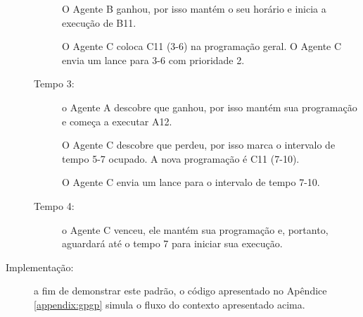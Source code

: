\begin{description}
\begin{description}
    O Agente B ganhou, por isso mantém o seu horário e inicia a execução de B11.
    
    O Agente C coloca C11 (3-6) na programação geral. O Agente C envia um lance para 3-6 com prioridade 2.
    
    \item [Tempo 3:] o Agente A descobre que ganhou, por isso mantém sua programação e começa a executar A12.
    
    O Agente C descobre que perdeu, por isso marca o intervalo de tempo 5-7 ocupado. A nova programação é C11 (7-10). 
    
    O Agente C envia um lance para o intervalo de tempo 7-10.
    
    \item [Tempo 4:] o Agente C venceu, ele mantém sua programação e, portanto, aguardará até o tempo 7 para iniciar sua execução.
    
\end{description}

\item[Implementação:] a fim de demonstrar este padrão, o código apresentado no Apêndice \ref{appendix:gpgp} simula o fluxo do contexto apresentado acima.



\end{description}

